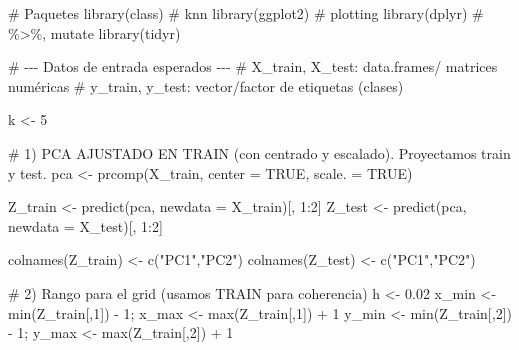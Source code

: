 \documentclass[
  letterpaper,
  DIV=11,
  numbers=noendperiod]{scrartcl}
\newenvironment{Shaded}{\begin{snugshade}}{\end{snugshade}}
\newcommand{\AttributeTok}[1]{\textcolor[rgb]{0.40,0.45,0.13}{#1}}
\newcommand{\CommentTok}[1]{\textcolor[rgb]{0.37,0.37,0.37}{#1}}
\newcommand{\ConstantTok}[1]{\textcolor[rgb]{0.56,0.35,0.01}{#1}}
\newcommand{\DecValTok}[1]{\textcolor[rgb]{0.68,0.00,0.00}{#1}}
\newcommand{\FloatTok}[1]{\textcolor[rgb]{0.68,0.00,0.00}{#1}}
\newcommand{\FunctionTok}[1]{\textcolor[rgb]{0.28,0.35,0.67}{#1}}
\newcommand{\NormalTok}[1]{\textcolor[rgb]{0.00,0.23,0.31}{#1}}
\newcommand{\OtherTok}[1]{\textcolor[rgb]{0.00,0.23,0.31}{#1}}
\newcommand{\SpecialCharTok}[1]{\textcolor[rgb]{0.37,0.37,0.37}{#1}}
\newcommand{\StringTok}[1]{\textcolor[rgb]{0.13,0.47,0.30}{#1}}
\begin{document}
\begin{Shaded}
\begin{Highlighting}[]
\CommentTok{\# Paquetes}
\FunctionTok{library}\NormalTok{(class)      }\CommentTok{\# knn}
\FunctionTok{library}\NormalTok{(ggplot2)    }\CommentTok{\# plotting}
\FunctionTok{library}\NormalTok{(dplyr)      }\CommentTok{\# \%\textgreater{}\%, mutate}
\FunctionTok{library}\NormalTok{(tidyr)}

\CommentTok{\# {-}{-}{-} Datos de entrada esperados {-}{-}{-}}
\CommentTok{\# X\_train, X\_test: data.frames/ matrices numéricas}
\CommentTok{\# y\_train, y\_test: vector/factor de etiquetas (clases)}

\NormalTok{k }\OtherTok{\textless{}{-}} \DecValTok{5}

\CommentTok{\# 1) PCA AJUSTADO EN TRAIN (con centrado y escalado). Proyectamos train y test.}
\NormalTok{pca }\OtherTok{\textless{}{-}} \FunctionTok{prcomp}\NormalTok{(X\_train, }\AttributeTok{center =} \ConstantTok{TRUE}\NormalTok{, }\AttributeTok{scale. =} \ConstantTok{TRUE}\NormalTok{)}

\NormalTok{Z\_train }\OtherTok{\textless{}{-}} \FunctionTok{predict}\NormalTok{(pca, }\AttributeTok{newdata =}\NormalTok{ X\_train)[, }\DecValTok{1}\SpecialCharTok{:}\DecValTok{2}\NormalTok{]}
\NormalTok{Z\_test  }\OtherTok{\textless{}{-}} \FunctionTok{predict}\NormalTok{(pca, }\AttributeTok{newdata =}\NormalTok{ X\_test)[, }\DecValTok{1}\SpecialCharTok{:}\DecValTok{2}\NormalTok{]}

\FunctionTok{colnames}\NormalTok{(Z\_train) }\OtherTok{\textless{}{-}} \FunctionTok{c}\NormalTok{(}\StringTok{"PC1"}\NormalTok{,}\StringTok{"PC2"}\NormalTok{)}
\FunctionTok{colnames}\NormalTok{(Z\_test)  }\OtherTok{\textless{}{-}} \FunctionTok{c}\NormalTok{(}\StringTok{"PC1"}\NormalTok{,}\StringTok{"PC2"}\NormalTok{)}

\CommentTok{\# 2) Rango para el grid (usamos TRAIN para coherencia)}
\NormalTok{h }\OtherTok{\textless{}{-}} \FloatTok{0.02}
\NormalTok{x\_min }\OtherTok{\textless{}{-}} \FunctionTok{min}\NormalTok{(Z\_train[,}\DecValTok{1}\NormalTok{]) }\SpecialCharTok{{-}} \DecValTok{1}\NormalTok{; x\_max }\OtherTok{\textless{}{-}} \FunctionTok{max}\NormalTok{(Z\_train[,}\DecValTok{1}\NormalTok{]) }\SpecialCharTok{+} \DecValTok{1}
\NormalTok{y\_min }\OtherTok{\textless{}{-}} \FunctionTok{min}\NormalTok{(Z\_train[,}\DecValTok{2}\NormalTok{]) }\SpecialCharTok{{-}} \DecValTok{1}\NormalTok{; y\_max }\OtherTok{\textless{}{-}} \FunctionTok{max}\NormalTok{(Z\_train[,}\DecValTok{2}\NormalTok{]) }\SpecialCharTok{+} \DecValTok{1}


\end{Highlighting}
\end{Shaded}
\end{document}
